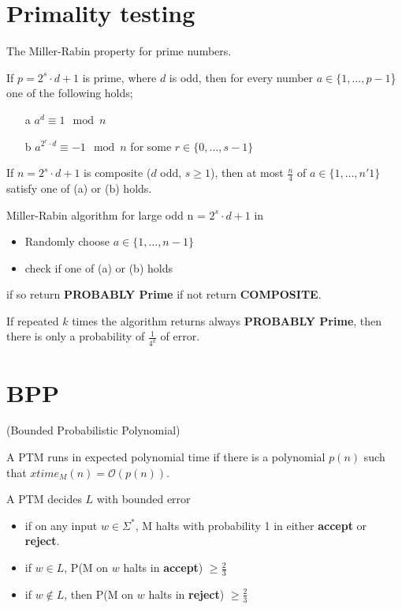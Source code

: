 \documentclass[a4paper,12pt]{article}
\theoremstyle{definition}
\theoremstyle{remark}
\begin{document}
\section{Primality testing}
The Miller-Rabin property for prime numbers.

If $p = 2^s \cdot d + 1$ is prime, where $d$ is odd, then for every number $a \in \{1, \dots, p-1$\} one of the following holds;
\begin{itemize}
    \item[a] $a^d \equiv 1 \mod n$
    \item[b] $a^{2^r \cdot d} \equiv -1 \mod n$ for some $r \in \{0, \dots, s-1\}$
\end{itemize}

If $n = 2^s \cdot d + 1$ is composite ($d$ odd, $s \geq 1$), then at most $\frac{n}{4}$ of $a \in \{1, \dots, n'1\}$ satisfy one of (a) or (b) holds.

Miller-Rabin algorithm for large odd n = $2^s \cdot d + 1$ in
\begin{itemize}
    \item Randomly choose $a \in \{1, \dots, n-1\}$
    \item check if one of (a) or (b) holds
\end{itemize}

if so return \textbf{PROBABLY Prime} if not return \textbf{COMPOSITE}.

If repeated $k$ times the algorithm returns always \textbf{PROBABLY Prime}, then there is only a probability of $\frac{1}{4^k}$ of error.


\section{BPP}

(Bounded Probabilistic Polynomial)

A PTM runs in expected polynomial time if there is a polynomial $p(n)$ such that $xtime_M(n) = \mathscr{O}(p(n))$.

A PTM decides $L$ with bounded error
\begin{itemize}
    \item if on any input $w \in \Sigma^*$, M halts with probability 1 in either \textbf{accept} or \textbf{reject}.
    \item if $w \in L$, P(M on $w$ halts in \textbf{accept}) $\geq \frac{2}{3}$
    \item if $w \notin L$, then P(M on $w$ halts in \textbf{reject}) $\geq \frac{2}{3}$
\end{itemize}
\end{document}
